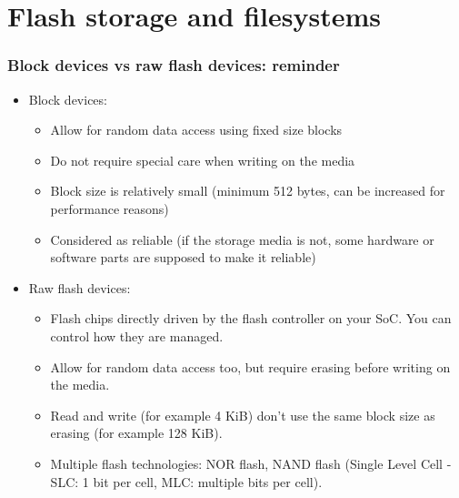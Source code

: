 \section{Flash storage and filesystems}

\begin{frame}
  \frametitle{Block devices vs raw flash devices: reminder}
  \begin{itemize}
  \item Block devices:
    \begin{itemize}
    \item Allow for random data access using fixed size blocks
    \item Do not require special care when writing on the media
    \item Block size is relatively small (minimum 512 bytes, can be
      increased for performance reasons)
    \item Considered as reliable (if the storage media is not, some
      hardware or software parts are supposed to make it reliable)
    \end{itemize}
  \item Raw flash devices:
    \begin{itemize}
    \item Flash chips directly driven by the flash controller on your SoC.
          You can control how they are managed.
    \item Allow for random data access too, but require erasing before
          writing on the media.
    \item Read and write (for example 4 KiB) don't use
          the same block size as erasing (for example 128 KiB).
    \item Multiple flash technologies: NOR flash, NAND
          flash (Single Level Cell - SLC: 1 bit per cell, MLC: multiple bits per cell).
    \end{itemize}
  \end{itemize}
\end{frame}

